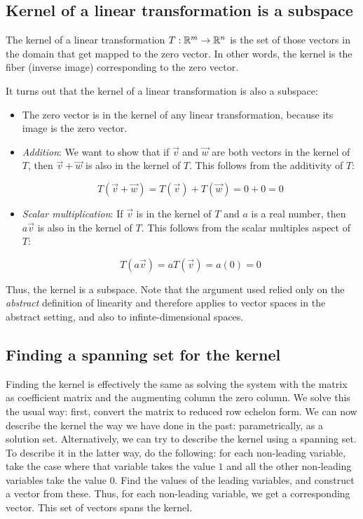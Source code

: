 \documentclass[10pt]{amsart}
\begin{document}
\subsection{Kernel of a linear transformation is a subspace}

The kernel of a linear transformation $T: \mathbb{R}^m \to \mathbb{R}^n$ is the set of
those vectors in the domain that get mapped to the zero vector. In
other words, the kernel is the fiber (inverse image) corresponding to
the zero vector.

It turns out that the kernel of a linear transformation is also a
subspace:

\begin{itemize}
\item The zero vector is in the kernel of any linear transformation,
  because its image is the zero vector.
\item {\em Addition}: We want to show that if $\vec{v}$ and $\vec{w}$
  are both vectors in the kernel of $T$, then $\vec{v} + \vec{w}$ is
  also in the kernel of $T$. This follows from the additivity of $T$:

  $$T(\vec{v} + \vec{w}) = T(\vec{v}) + T(\vec{w}) = 0 + 0 = 0$$
\item {\em Scalar multiplication}: If $\vec{v}$ is in the kernel of
  $T$ and $a$ is a real number, then $a\vec{v}$ is also in the kernel
  of $T$. This follows from the scalar multiples aspect of $T$:

  $$T(a\vec{v}) = aT(\vec{v}) = a(0) = 0$$
\end{itemize}

Thus, the kernel is a subspace. Note that the argument used relied
only on the {\em abstract} definition of linearity and therefore
applies to vector spaces in the abstract setting, and also to
infinte-dimensional spaces.

\subsection{Finding a spanning set for the kernel}

Finding the kernel is effectively the same as solving the system with
the matrix as coefficient matrix and the augmenting column the zero
column. We solve this the usual way: first, convert the matrix to
reduced row echelon form. We can now describe the kernel the way we
have done in the past: parametrically, as a solution
set. Alternatively, we can try to describe the kernel using a spanning
set. To describe it in the latter way, do the following: for each
non-leading variable, take the case where that variable takes the
value $1$ and all the other non-leading variables take the value
$0$. Find the values of the leading variables, and construct a vector
from these. Thus, for each non-leading variable, we get a
corresponding vector. This set of vectors spans the kernel.
\end{document}
